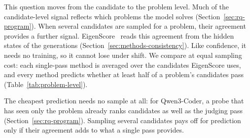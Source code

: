 This question moves from the candidate to the problem level. Much of the
candidate-level signal reflects which problems the model solves
(Section~\ref{sec:rq-program}). When several candidates are sampled for a
problem, their agreement provides a further signal.
EigenScore~\cite{Chen24Eigenscore} reads this agreement from the hidden states
of the generations (Section~\ref{sec:methods-consistency}). Like confidence, it
needs no training, so it cannot lose under shift. We compare at equal sampling
cost: each single-pass method is averaged over the candidates EigenScore uses,
and every method predicts whether at least half of a problem's candidates pass
(Table~\ref{tab:problem-level}).





The cheapest prediction needs no sample at all: for Qwen3-Coder, a probe that
has seen only the problem %
already ranks candidates as well as the judging pass
(Section~\ref{sec:rq-program}). Sampling several candidates pays off for
prediction only if their agreement adds to what a single pass provides.

